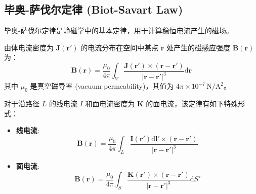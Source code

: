 \documentclass[fontset=none]{ctexart}
\begin{document}
\subsection{毕奥-萨伐尔定律 (Biot-Savart Law)}
毕奥-萨伐尔定律是静磁学中的基本定律，用于计算稳恒电流产生的磁场。
\begin{proposition}[毕奥-萨伐尔定律]
    由体电流密度为 $\bm{J}(\bm{r'})$ 的电流分布在空间中某点 $\bm{r}$ 处产生的磁感应强度 $\bm{B}(\bm{r})$ 为：
    \begin{equation}
        \bm{B}(\bm{r}) = \frac{\mu_0}{4\pi} \int_V \frac{\bm{J}(\bm{r'}) \times (\bm{r}-\bm{r'})}{|\bm{r}-\bm{r'}|^3} \mathrm{d}\bm{r}
    \end{equation}
    其中 $\mu_0$ 是真空磁导率 (vacuum permeability)，其值为 $4\pi \times 10^{-7} \, \mathrm{N/A^2}$。

    对于沿路径 $L$ 的线电流 $I$ 和面电流密度为 $\bm{K}$ 的面电流，该定律有如下特殊形式：
    \begin{itemize}
        \item \textbf{线电流}: 
        \begin{equation}
        \bm{B}(\bm{r}) = \frac{\mu_0}{4\pi} \int_L \frac{\bm{I}(\bm{r'})\mathrm{d}\bm{l'} \times (\bm{r}-\bm{r'})}{|\bm{r}-\bm{r'}|^3}
        \end{equation}
        \item \textbf{面电流}: 
        \begin{equation}
        \bm{B}(\bm{r}) = \frac{\mu_0}{4\pi} \int_S \frac{\bm{K}(\bm{r'}) \times (\bm{r}-\bm{r'})}{|\bm{r}-\bm{r'}|^3} \mathrm{d}S'
        \end{equation}
    \end{itemize}
\end{proposition}
\end{document}
